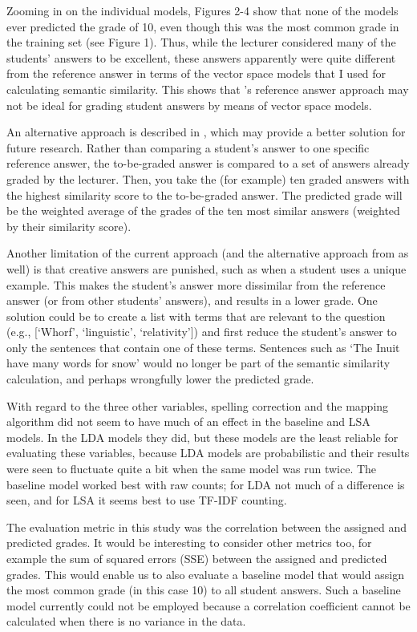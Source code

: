 \documentclass[a4paper,10pt,twoside]{article}
\begin{document}
Zooming in on the individual models, Figures 2-4 show that none of the models ever predicted the grade of 10, even though this was the most common grade in the training set (see Figure 1). Thus, while the lecturer considered many of the students’ answers to be excellent, these answers apparently were quite different from the reference answer in terms of the vector space models that I used for calculating semantic similarity. This shows that \cite{wolfe1998}'s reference answer approach may not be ideal for grading student answers by means of vector space models.

An alternative approach is described in \cite{foltz1998}, which may provide a better solution for future research. Rather than comparing a student's answer to one specific reference answer, the to-be-graded answer is compared to a set of answers already graded by the lecturer. Then, you take the (for example) ten graded answers with the highest similarity score to the to-be-graded answer. The predicted grade will be the weighted average of the grades of the ten most similar answers (weighted by their similarity score).

Another limitation of the current approach (and the alternative approach from \cite{foltz1998} as well) is that creative answers are punished, such as when a student uses a unique example. This makes the student’s answer more dissimilar from the reference answer (or from other students’ answers), and results in a lower grade. One solution could be to create a list with terms that are relevant to the question (e.g., [`Whorf', `linguistic', `relativity']) and first reduce the student’s answer to only the sentences that contain one of these terms. Sentences such as ‘The Inuit have many words for snow’ would no longer be part of the semantic similarity calculation, and perhaps wrongfully lower the predicted grade.

With regard to the three other variables, spelling correction and the mapping algorithm did not seem to have much of an effect in the baseline and LSA models. In the LDA models they did, but these models are the least reliable for evaluating these variables, because LDA models are probabilistic and their results were seen to fluctuate quite a bit when the same model was run twice. The baseline model worked best with raw counts; for LDA not much of a difference is seen, and for LSA it seems best to use TF-IDF counting.

The evaluation metric in this study was the correlation between the assigned and predicted grades. It would be interesting to consider other metrics too, for example the sum of squared errors (SSE) between the assigned and predicted grades. This would enable us to also evaluate a baseline model that would assign the most common grade (in this case 10) to all student answers. Such a baseline model currently could not be employed because a correlation coefficient cannot be calculated when there is no variance in the data.
\end{document}
